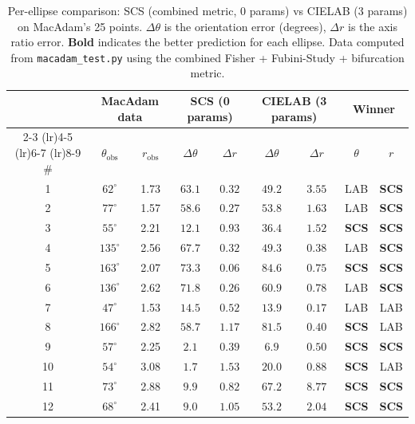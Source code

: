 \documentclass[12pt,a4paper]{article}
\begin{document}
\begin{table}[ht]
\centering
\caption{Per-ellipse comparison: SCS (combined metric, 0 params) vs
CIELAB (3 params) on MacAdam's 25 points. $\Delta\theta$ is the
orientation error (degrees), $\Delta r$ is the axis ratio error.
\textbf{Bold} indicates the better prediction for each ellipse.
Data computed from \texttt{macadam\_test.py} using the combined
Fisher + Fubini-Study + bifurcation metric.}
\label{tab:macadam}
\small
\begin{tabular}{ccccccccc}
\toprule
 & \multicolumn{2}{c}{MacAdam data} & \multicolumn{2}{c}{SCS (0 params)} & \multicolumn{2}{c}{CIELAB (3 params)} & \multicolumn{2}{c}{Winner} \\
\cmidrule(lr){2-3} \cmidrule(lr){4-5} \cmidrule(lr){6-7} \cmidrule(lr){8-9}
\# & $\theta_{\mathrm{obs}}$ & $r_{\mathrm{obs}}$ & $\Delta\theta$ & $\Delta r$ & $\Delta\theta$ & $\Delta r$ & $\theta$ & $r$ \\
\midrule
1  & $62^\circ$  & 1.73 & $63.1$ & $\mathbf{0.32}$ & $\mathbf{49.2}$ & $3.55$ & LAB & \textbf{SCS} \\
2  & $77^\circ$  & 1.57 & $58.6$ & $\mathbf{0.27}$ & $\mathbf{53.8}$ & $1.63$ & LAB & \textbf{SCS} \\
3  & $55^\circ$  & 2.21 & $\mathbf{12.1}$ & $\mathbf{0.93}$ & $36.4$ & $1.52$ & \textbf{SCS} & \textbf{SCS} \\
4  & $135^\circ$ & 2.56 & $67.7$ & $\mathbf{0.32}$ & $\mathbf{49.3}$ & $0.38$ & LAB & \textbf{SCS} \\
5  & $163^\circ$ & 2.07 & $\mathbf{73.3}$ & $\mathbf{0.06}$ & $84.6$ & $0.75$ & \textbf{SCS} & \textbf{SCS} \\
6  & $136^\circ$ & 2.62 & $71.8$ & $\mathbf{0.26}$ & $\mathbf{60.9}$ & $0.78$ & LAB & \textbf{SCS} \\
7  & $47^\circ$  & 1.53 & $14.5$ & $0.52$ & $\mathbf{13.9}$ & $\mathbf{0.17}$ & LAB & LAB \\
8  & $166^\circ$ & 2.82 & $\mathbf{58.7}$ & $1.17$ & $81.5$ & $\mathbf{0.40}$ & \textbf{SCS} & LAB \\
9  & $57^\circ$  & 2.25 & $\mathbf{2.1}$  & $\mathbf{0.39}$ & $6.9$  & $0.50$ & \textbf{SCS} & \textbf{SCS} \\
10 & $54^\circ$  & 3.08 & $\mathbf{1.7}$  & $1.53$ & $20.0$ & $\mathbf{0.88}$ & \textbf{SCS} & LAB \\
11 & $73^\circ$  & 2.88 & $\mathbf{9.9}$  & $\mathbf{0.82}$ & $67.2$ & $8.77$ & \textbf{SCS} & \textbf{SCS} \\
12 & $68^\circ$  & 2.41 & $\mathbf{9.0}$  & $\mathbf{1.05}$ & $53.2$ & $2.04$ & \textbf{SCS} & \textbf{SCS} \\

\end{tabular}
\end{table}
\end{document}
